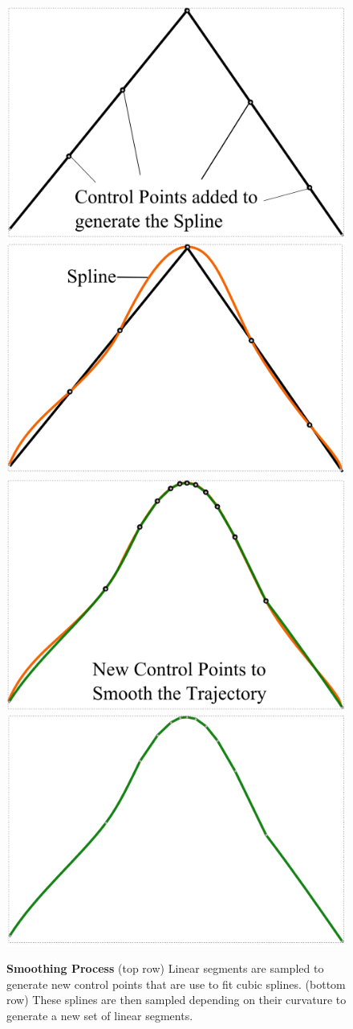 \begin{figure}[t]
	\begin{center}
	\includegraphics[width=0.48\linewidth]{./images/Smooth1.png}
	\includegraphics[width=0.48\linewidth]{./images/Smooth2.png}\\
	\includegraphics[width=0.48\linewidth]{./images/Smooth3.png}
	\includegraphics[width=0.48\linewidth]{./images/Smooth4.png}
	\caption{
		\textbf{Smoothing Process} (top row) Linear segments are sampled to generate new control points that are use to fit cubic splines.
		(bottom row) These splines are then sampled depending on their curvature to generate a new set of linear segments.
	}
	\label{fig:smoothing}
	\end{center}
\end{figure}


